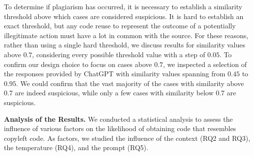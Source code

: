 To determine if plagiarism has occurred, it is necessary to establish a similarity threshold above which cases are considered suspicious. It is hard to establish an exact threshold, but any code reuse to represent the outcome of a potentially illegitimate action must have a lot in common with the source. For these reasons, rather than using a single hard threshold, we discuss results for similarity values above $0.7$, considering every possible threshold value with a step of $0.05$. To confirm our design choice to focus on cases above $0.7$, we inspected a selection of the responses provided by ChatGPT with similarity values spanning from $0.45$ to $0.95$. We could confirm that the vast majority of the cases with similarity above $0.7$ are indeed suspicious, while only a few cases with similarity below $0.7$ are suspicious. 






\textbf{Analysis of the Results.} We conducted a statistical analysis to assess the influence of various factors on the likelihood of obtaining code that resembles copyleft code. As factors, we studied the influence of the context (RQ2 and RQ3), the temperature (RQ4), and the prompt (RQ5). 


